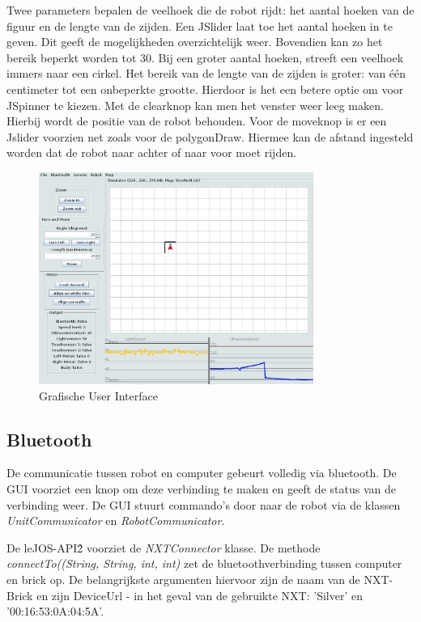 \documentclass[tt3]{penoverslag}
\begin{document}
Twee parameters bepalen de veelhoek die de robot rijdt: het aantal hoeken van de figuur en de lengte van de zijden.
Een JSlider laat toe het aantal hoeken in te geven. Dit geeft de mogelijkheden overzichtelijk weer. Bovendien kan zo het bereik beperkt worden tot 30. Bij een groter aantal hoeken, streeft een veelhoek immers naar een cirkel.
Het bereik van de lengte van de zijden is groter: van \'e\'en centimeter tot een onbeperkte grootte. Hierdoor is het een betere optie om voor JSpinner te kiezen. Met de clearknop kan men het venster weer leeg maken. Hierbij wordt de positie van de robot behouden.
Voor de moveknop is er een Jslider voorzien net zoals voor de polygonDraw. Hiermee kan de afstand ingesteld worden dat de robot naar achter of naar voor moet rijden.

\begin{figure}[tbp]
\begin{center}
    \includegraphics[width=0.8\textwidth]{GUI}
    \caption{Grafische User Interface}
	\label{fig:gui}
\end{center}
\end{figure}

\subsection{Bluetooth} %
\label{ssec:bluetooth}
De communicatie tussen robot en computer gebeurt volledig via bluetooth. De GUI voorziet een knop om deze verbinding te maken en geeft de status van de verbinding weer. De GUI stuurt commando's door naar de robot via de klassen \textit{UnitCommunicator} en \textit{RobotCommunicator}.

De leJOS-API\^{2} voorziet de \textit{NXTConnector} klasse. De methode \textit{connectTo((String, String, int, int)} zet de bluetoothverbinding tussen computer en brick op. De belangrijkste argumenten hiervoor zijn de naam van de NXT-Brick en zijn DeviceUrl  - in het geval van de gebruikte NXT: 'Silver' en '00:16:53:0A:04:5A'.
\end{document}
